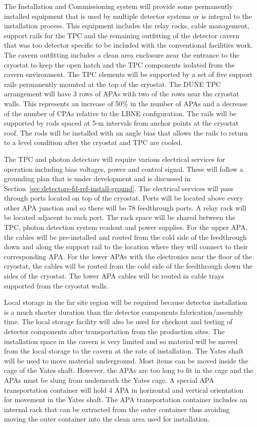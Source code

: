 The Installation and Commissioning system will provide some
permanently installed equipment that is used by multiple detector
systems or is integral to the installation process. This equipment
includes the relay racks, cable management, support rails for the TPC
and the remaining outfitting of the detector cavern that was too
detector specific to be included with the conventional facilities
work. The cavern outfitting includes a clean area enclosure near the
entrance to the cryostat to keep the open hatch and the TPC components
isolated from the cavern environment. The TPC elements will be
supported by a set of five support rails permanently mounted at the
top of the cryostat. The DUNE TPC arrangement will have 3 rows of APAs
with two of the rows near the cryostat walls. This represents an
increase of 50\% in the number of APAs and a decrease of the number of
CPAs relative to the LBNE configuration. The rails will be supported
by rods spaced at 5-m intervals from anchor points at the cryostat
roof. The rods will be installed with an angle bias that allows the
rails to return to a level condition after the cryostat and TPC are
cooled.

The TPC and photon detectors will require various electrical services
for operation including bias voltages, power and control signal. These
will follow a grounding plan that is under development and is
discussed in Section~\ref{sec:detectors-fd-ref-install-ground}.  The
electrical services will pass through ports located on top of the
cryostat. Ports will be located above every other APA junction and so
there will be 78 feedthrough ports. A relay rack will be located
adjacent to each port. The rack space will be shared between the TPC,
photon detection system readout and power supplies. For the upper APA,
the cables will be pre-installed and routed from the cold side of the
feedthrough down and along the support rail to the location where they
will connect to their corresponding APA. For the lower APAs with the
electronics near the floor of the cryostat, the cables will be routed
from the cold side of the feedthrough down the sides of the
cryostat. The lower APA cables will be routed in cable trays supported
from the cryostat walls.

Local storage in the far site region will be required because detector
installation is a much shorter duration than the detector components
fabrication/assembly time. The local storage facility will also be
used for checkout and testing of detector components after
transportation from the production sites. The installation space in
the cavern is very limited and so material will be moved from the
local storage to the cavern at the rate of installation. The Yates
shaft will be used to move material underground. Most items can be
moved inside the cage of the Yates shaft. However, the APAs are too
long to fit in the cage and the APAs must be slung from underneath the
Yates cage. A special APA transportation container will hold 4 APA in
horizontal and vertical orientation for movement in the Yates shaft.
The APA transportation container includes an internal rack that can be
extracted from the outer container thus avoiding moving the outer
container into the clean area used for installation.

